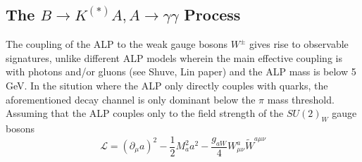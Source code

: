 \documentclass{article}
\begin{document}
\subsection*{The $B\rightarrow K^{(*)}A, A\rightarrow \gamma\gamma$ Process}
The coupling of the ALP to the weak gauge bosons $W^{\pm}$ gives rise to observable signatures, unlike different ALP models wherein the main effective coupling is with photons and/or gluons (see Shuve, Lin paper) and the ALP mass is below 5 GeV. In the sitution where the ALP only directly couples with quarks, the aforementioned decay channel is only dominant below the $\pi$ mass threshold. Assuming that the ALP couples only to the field strength of the $SU(2)_{W}$ gauge bosons
\begin{equation}
    \mathcal{L} = (\partial_{\mu} a)^{2}-\frac{1}{2}M_{a}^{2}a^{2}-\frac{g_{aW}}{4}W_{\mu\nu}^{a}\tilde{W}^{a\mu\nu}
\end{equation}
\end{document}
